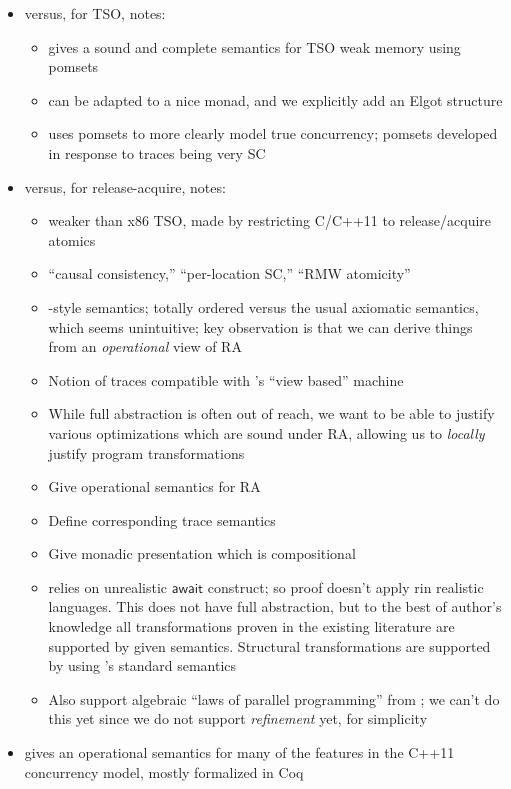 \documentclass[acmsmall,screen,review]{acmart}
\newcommand{\ms}[1]{\ensuremath{\mathsf{#1}}}
\begin{document}
\begin{itemize}
\begin{itemize}
  \end{itemize}
  \item versus, for TSO, \citet{sparky} notes:
  \begin{itemize}
    \item gives a sound and complete semantics for TSO weak memory using pomsets
    \item can be adapted to a nice monad, and we explicitly add an Elgot structure
    \item uses pomsets to more clearly model true concurrency; pomsets developed in response to
    traces being very SC
  \end{itemize}
  \item versus, for release-acquire, \citet{release-acquire} notes:
  \begin{itemize}
    \item weaker than x86 TSO, made by restricting C/C++11 to release/acquire atomics
    \item ``causal consistency,'' ``per-location SC,'' ``RMW atomicity''
    \item \citet{brookes-full-abstraction-96}-style semantics; totally ordered versus the usual
    axiomatic semantics, which seems unintuitive; key observation is that we can derive things from
    an \emph{operational} view of RA
    \item Notion of traces compatible with \citet{kang-promising-17}'s ``view based'' machine
    \item While full abstraction is often out of reach, we want to be able to justify various
    optimizations which are sound under RA, allowing us to \emph{locally} justify program
    transformations
    \item Give operational semantics for RA
    \item Define corresponding trace semantics
    \item Give monadic presentation which is compositional
    \item \citet{brookes-full-abstraction-96} relies on unrealistic $\ms{await}$ construct; so proof
    doesn't apply rin realistic languages. This does not have full abstraction, but to the best of
    author's knowledge all transformations proven in the existing literature are supported by given
    semantics. Structural transformations are supported by using \citet{moggi-91-monad}'s standard
    semantics
    \item Also support algebraic ``laws of parallel programming'' from \citet{hoare-parallel-14};
    we can't do this yet since we do not support \emph{refinement} yet, for simplicity
  \end{itemize}
  \item \citet{kang-promising-17} gives an operational semantics for many of the features in the
  C++11 concurrency model, mostly formalized in Coq
\end{itemize}
\end{document}
